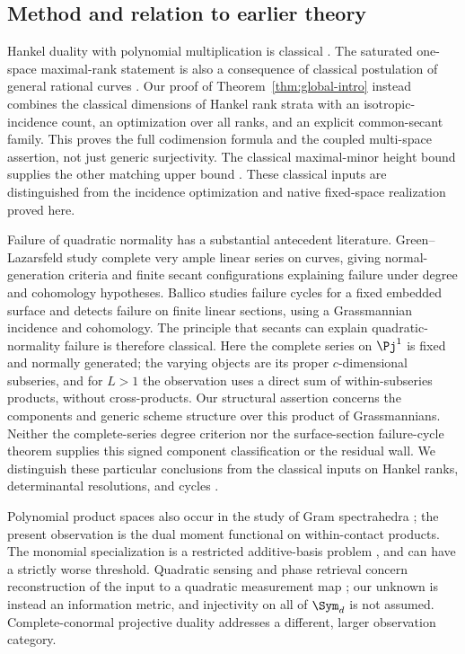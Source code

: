 \subsection*{Method and relation to earlier theory}
Hankel duality with polynomial multiplication is classical \cite{MP}. The saturated one-space maximal-rank statement is also a consequence of classical postulation of general rational curves \cite{BE85,BE87,Larson}. Our proof of Theorem~\ref{thm:global-intro} instead combines the classical dimensions of Hankel rank strata \cite[Sections 1--2]{CMSV} with an isotropic-incidence count, an optimization over all ranks, and an explicit common-secant family. This proves the full codimension formula and the coupled multi-space assertion, not just generic surjectivity. The classical maximal-minor height bound supplies the other matching upper bound \cite[Introduction]{EHU}. These classical inputs are distinguished from the incidence optimization and native fixed-space realization proved here.

Failure of quadratic normality has a substantial antecedent literature. Green--Lazarsfeld \cite[Theorems 1 and 3]{GL86} study complete very ample linear series on curves, giving normal-generation criteria and finite secant configurations explaining failure under degree and cohomology hypotheses. Ballico \cite[Theorem 0.2]{Ballico96} studies failure cycles for a fixed embedded surface and detects failure on finite linear sections, using a Grassmannian incidence and cohomology. The principle that secants can explain quadratic-normality failure is therefore classical. Here the complete series on $\Pj^1$ is fixed and normally generated; the varying objects are its proper $c$-dimensional subseries, and for $L>1$ the observation uses a direct sum of within-subseries products, without cross-products. Our structural assertion concerns the components and generic scheme structure over this product of Grassmannians. Neither the complete-series degree criterion nor the surface-section failure-cycle theorem supplies this signed component classification or the residual wall. We distinguish these particular conclusions from the classical inputs on Hankel ranks, determinantal resolutions, and cycles \cite{CMSV,EN,Kustin,KL,Fulton}.

Polynomial product spaces also occur in the study of Gram spectrahedra \cite{Sch}; the present observation is the dual moment functional on within-contact products. The monomial specialization is a restricted additive-basis problem \cite{Yu,Kohonen14,Kohonen17}, and can have a strictly worse threshold. Quadratic sensing and phase retrieval concern reconstruction of the input to a quadratic measurement map \cite{BCE}; our unknown is instead an information metric, and injectivity on all of $\Sym_d$ is not assumed. Complete-conormal projective duality \cite{GKZ} addresses a different, larger observation category.

